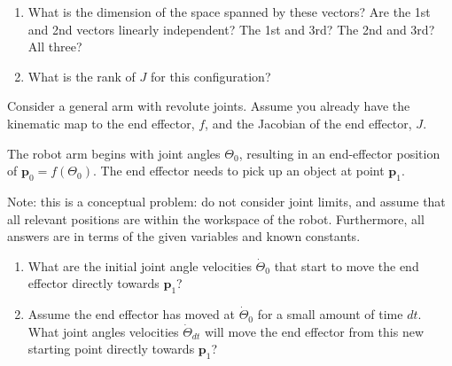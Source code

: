 \documentclass{16384_doc} %
\begin{document}
\begin{questions}
\begin{enumerate} [label=\alph*.]
        \item \text{[2 points]} What is the dimension of the space spanned by these vectors? Are
        the 1st and 2nd vectors linearly independent? The 1st and 3rd?  The 2nd
        and 3rd? All three?
        \begin{tcolorbox}[height=3cm]
        \end{tcolorbox}
        
        \item \text{[1 point]} What is the rank of $J$ for this configuration?
        \begin{tcolorbox}[height=3cm]
        \end{tcolorbox}
        
    \end{enumerate}


    Consider a general arm with revolute joints. Assume you already have the
    kinematic map to the end effector, $f$, and the Jacobian of the end
    effector, $J$.

    The robot arm begins with joint angles $\Theta_0$, resulting in an
    end-effector position of $\mathbf{p}_0 = f(\Theta_0)$.  The end effector
    needs to pick up an object at point $\mathbf{p}_1$.

    Note: this is a conceptual problem: do not consider joint limits, and
    assume that all relevant positions are within the workspace of the robot.
    Furthermore, all answers are in terms of the given variables and known
    constants.
    
    \begin{enumerate} [label=\alph*.]
        \item \text{[2 points]} What are the initial joint angle velocities $\dot{\Theta}_0$ that
      start to move the end effector directly towards $\mathbf{p}_1$?
      \begin{tcolorbox}[height=3cm]
        \end{tcolorbox}
        
        \item \text{[3 points]} Assume the end effector has moved at $\dot{\Theta}_0$ for a small
      amount of time $dt$.  What joint angles velocities $\dot{\Theta}_{dt}$
      will move the end effector from this new starting point directly towards
      $\mathbf{p}_1$?
      \begin{tcolorbox}[height=3cm]
        \end{tcolorbox}
        

\end{enumerate}
\end{questions}
\end{document}
